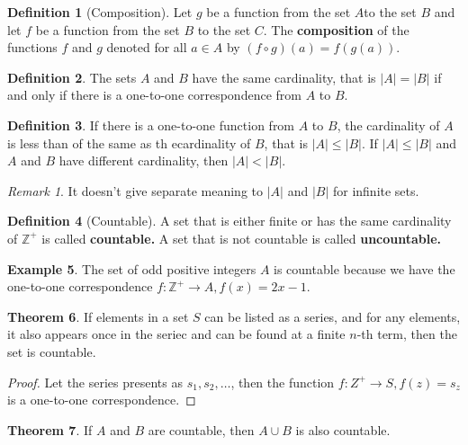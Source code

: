 \documentclass[12pt,a4paper]{report}
\theoremstyle{definition}
\newtheorem{theorem}{Theorem}[section]
\newtheorem{definition}[theorem]{Definition}
\newtheorem{example}[theorem]{Example}
\theoremstyle{remark}
\newtheorem*{remark}{Remark}
\newcommand{\Z}{\mathbb{Z}}
\begin{document}
\begin{definition}[Composition]
    Let $g$ be a function from the set $A$to the set $B$ and let $f$ be a function from the set $B$ to the set $C$. The \textbf{composition} of the functions $f$ and $g$ denoted for all $a \in A$ by $(f \circ g)(a) = f(g(a)).$
\end{definition}

\begin{definition}
    The sets $A$ and $B$ have the same cardinality, that is $|A| = |B|$ if and only if there is a one-to-one correspondence from $A$ to $B$. 
\end{definition}

\begin{definition}
    If there is a one-to-one function from $A$ to $B$, the cardinality of $A$ is less than of the same as th ecardinality of $B$, that is $|A| \leq |B|$. If $|A| \leq |B|$ and $A$ and $B$ have different cardinality, then $|A| < |B|$.
\end{definition}

\begin{remark}
    It doesn't give separate meaning to $|A|$ and $|B|$ for infinite sets.
\end{remark}

\begin{definition}[Countable]
    A set that is either finite or has the same cardinality of $\Z^+$ is called \textbf{countable.} A set that is not countable is called \textbf{uncountable.}
\end{definition}

\begin{example}
    The set of odd positive integers $A$ is countable because we have the one-to-one correspondence $f:\Z^+ \to A, f(x) = 2x - 1.$
\end{example}

\begin{theorem}
    If elements in a set $S$ can be listed as a series, and for any elements, it also appears once in the seriec and can be found at a finite $n$-th term, then the set is countable.  
\end{theorem}

\begin{proof}
    Let the series presents as $s_1, s_2, \ldots$, then the function $f:Z^+ \to S, f(z) = s_z$ is a one-to-one correspondence.
\end{proof}

\begin{theorem}
    If $A$ and $B$ are countable, then $A \cup B$ is also countable.
\end{theorem}
\end{document}
